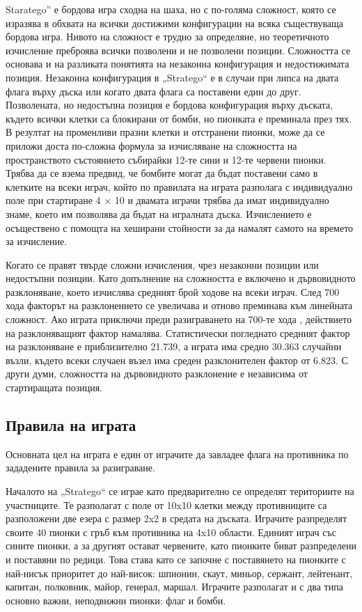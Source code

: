 Staratego” е бордова игра сходна на шаха, но с по-голяма сложност, която се изразява в обхвата на всички достижими конфигурации на всяка съществуваща бордова игра. Нивото на сложност е трудно за определяне, но теоретичното изчисление преброява всички позволени и не позволени позиции. Сложността се основава и на разликата понятията на незаконна конфигурация и недостижимата позиция. Незаконна конфигурация в „Stratego“ е в случаи при липса на двата флага върху дъска или когато двата флага са поставени един до друг. Позволената, но недостъпна позиция е бордова конфигурация върху дъската, където всички клетки са блокирани от бомби, но пионката е преминала през тях. В резултат на променливи празни клетки и отстранени пионки, може да се приложи доста по-сложна формула за изчисляване на сложността на пространството състоянието събирайки 12-те сини и 12-те червени пионки. Трябва да се взема предвид, че бомбите могат да бъдат поставени само в клетките на всеки играч, който по правилата на играта разполага с индивидуално поле при стартиране 4 × 10 и двамата играчи трябва да имат индивидуално знаме, което им позволява да бъдат на игралната дъска. Изчислението е осъществено с помощта на хеширани стойности за да намалят самото на времето за изчисление.

Когато се правят твърде сложни изчисления, чрез незаконни позиции или недостъпни  позиции. Като допълнение на сложността е включено и дървовидното разклоняване, което изчислява средният брой ходове на всеки играч. След 700 хода факторът на разклонението се увеличава и отново преминава към линейната сложност. Ако играта приключи преди разиграването на 700-те хода , действието на разклоняващият фактор намалява. Статистически погледнато средният фактор на разклоняване е приблизително 21.739, а играта има средно 30.363 случайни възли, където всеки случаен възел има среден разклонителен фактор от 6.823. С други думи, сложността на дървовидното разклонение е независима от стартиращата позиция.

\subsection{Правила на играта}

Основната цел на играта е един от играчите да завладее флага на противника по зададените правила за разиграване.

Началото на „Stratego“ се играе като предварително се определят териториите на участниците. Те разполагат с поле от 10x10 клетки между противниците са разположени две езера с размер 2x2 в средата на дъската. Играчите разпределят своите 40 пионки с гръб към противника на 4x10 области. Единият играч със сините пионки, а за другият остават червените, като пионките биват разпределени и поставяни по редици. Това става като се започне с поставянето на пионките с най-нисък приоритет до най-висок: шпионин, скаут, миньор, сержант, лейтенант, капитан, полковник, майор, генерал, маршал. Играчите разполагат и с два типа основно важни, неподвижни пионки: флаг и бомби.

